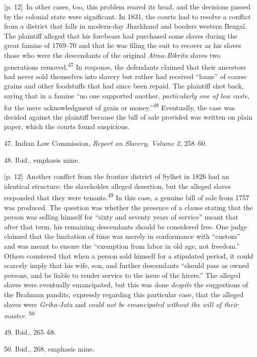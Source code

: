 \documentclass[10pt,a4paper]{article}
\begin{document}
{\scriptsize\color{gray} [p. 12]}\ In other cases, too, this problem reared its head, and the decisions passed by the colonial state were significant. In 1831, the courts had to resolve a conflict from a district that falls in modern-day Jharkhand and borders western Bengal. The plaintiff alleged that his forebears had purchased some slaves during the great famine of 1769–70 and that he was filing the suit to recover as his slaves those who were the descendants of the original \textit{Atma-Bikrita} slaves two generations removed.\nobreak\textsuperscript{47} In response, the defendants claimed that their ancestors had never sold themselves into slavery but rather had received “loans” of coarse grains and other foodstuffs that had since been repaid. The plaintiff shot back, saying that in a famine “no one supported another, \textit{particularly one of low caste}, for the mere acknowledgment of grain or money.”\nobreak\textsuperscript{48} Eventually, the case was decided against the plaintiff because the bill of sale provided was written on plain paper, which the courts found suspicious.\par{\small 47. Indian Law Commission, \textit{Report on Slavery, Volume 2}, 258–60.\par}{\small 48. Ibid., emphasis mine.\par}
{\scriptsize\color{gray} [p. 12]}\ Another conflict from the frontier district of Sylhet in 1826 had an identical structure: the slaveholder alleged desertion, but the alleged slaves responded that they were tenants.\nobreak\textsuperscript{49} In this case, a genuine bill of sale from 1757 was produced. The question was whether the presence of a clause stating that the person was selling himself for “sixty and seventy years of service” meant that after that term, his remaining descendants should be considered free. One judge claimed that the limitation of time was merely in conformance with “custom” and was meant to ensure the “exemption from labor in old age, not freedom.” Others countered that when a person sold himself for a stipulated period, it could scarcely imply that his wife, son, and further descendants “should pass as owned persons, and be liable to render service to the issue of the hirers.” The alleged slaves were eventually emancipated, but this was done \textit{despite} the suggestions of the Brahman pandits, expressly regarding this particular case, that the alleged slaves were \textit{Griha-Jata} and \textit{could not be emancipated without the will of their master.} \nobreak\textsuperscript{50}\par{\small 49. Ibid., 265–68.\par}{\small 50. Ibid., 268, emphasis mine.\par}
\end{document}
